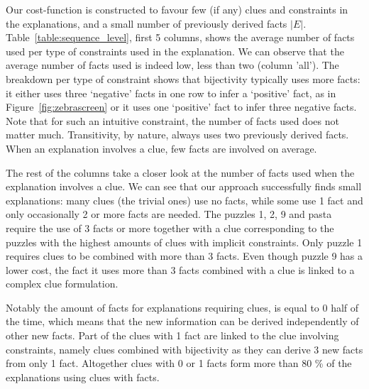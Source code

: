 
Our cost-function is constructed to favour few (if any) clues and constraints in the explanations, and a small number of previously derived facts $|E|$.
Table~\ref{table:sequence_level}, first 5 columns, shows the average number of facts used per type of constraints used in the explanation.
We can observe that the average number of facts used is indeed low, less than two (column 'all').
The breakdown per type of constraint shows that bijectivity typically uses more facts: it either uses three `negative' facts in one row to infer a `positive' fact, as in Figure~\ref{fig:zebrascreen} or it uses one `positive' fact to infer three negative facts.
Note that for such an intuitive constraint, the number of facts used does not matter much. 
Transitivity, by nature, always uses two previously derived facts.
When an explanation involves a clue, few facts are involved on average. 

The rest of the columns take a closer look at the number of facts used when the explanation involves a clue. We can see that our approach successfully finds small explanations: many clues (the trivial ones) use no facts, while some use 1 fact and only occasionally 2 or more facts are needed. 
The puzzles 1, 2, 9 and pasta require the use of 3 facts or more together with a clue corresponding to the puzzles with the highest amounts of clues with implicit constraints. Only puzzle 1 requires clues to be combined with more than 3 facts.
Even though puzzle 9 has a lower cost, the fact it uses more than 3 facts combined with a clue is linked to a complex clue formulation.


Notably the amount of facts for explanations requiring clues, is equal to 0 half of the time, which means that the new information can 
be derived independently of other new facts. 
Part of the clues with 1 fact are linked to the clue involving constraints, namely clues combined with bijectivity as they can derive  3 new facts from only 1 fact.
Altogether clues with 0 or 1 facts form more than 80 \% of the explanations using clues with facts. 


